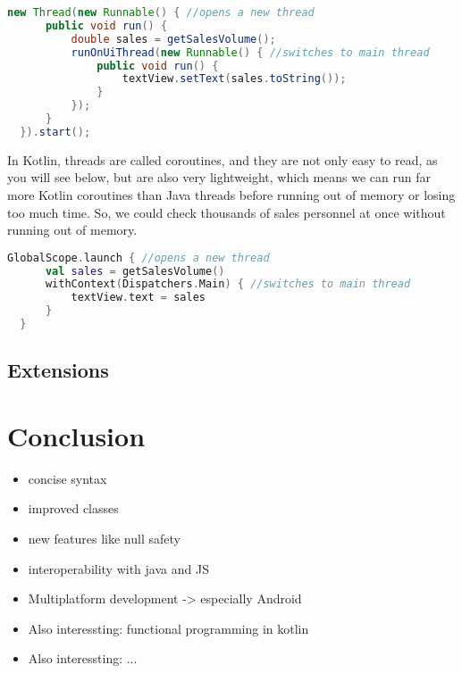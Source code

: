 \documentclass[a4paper, 11pt]{article}
\begin{document}
  \begin{lstlisting}[language=Java, title={Java Background Threads}]
  new Thread(new Runnable() { //opens a new thread
      public void run() {
          double sales = getSalesVolume();
          runOnUiThread(new Runnable() { //switches to main thread
              public void run() {
                  textView.setText(sales.toString());
              }
          });
      }
  }).start();
  \end{lstlisting}
  In Kotlin, threads are called coroutines, and they are not only easy to read, as you will see below, but are also very lightweight, which means we can run far more Kotlin coroutines than Java threads before running out of memory or losing too much time.
  So, we could check thousands of sales personnel at once without running out of memory.
  \begin{lstlisting}[language = Kotlin, title = Kotlin Coroutines]
  GlobalScope.launch { //opens a new thread
      val sales = getSalesVolume() 
      withContext(Dispatchers.Main) { //switches to main thread
          textView.text = sales 
      }
  }
  \end{lstlisting}

\subsection{Extensions}


\section{Conclusion}
  \begin{itemize}
    \item concise syntax
    \item improved classes
    \item new features like null safety
    \item interoperability with java and JS
    \item Multiplatform development -> especially Android
    \item Also interessting: functional programming in kotlin
    \item Also interessting: ...
  \end{itemize}


\newpage
\printbibliography[]

\end{document}
